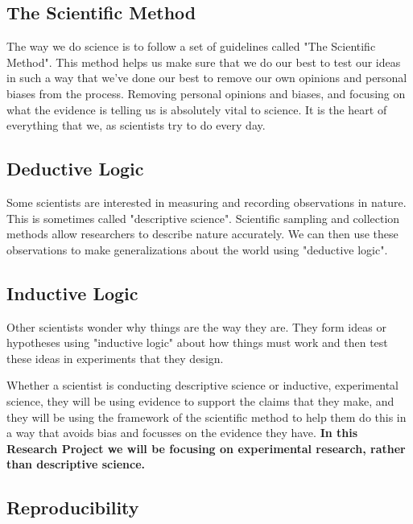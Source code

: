 \documentclass[
]{book}
\begin{document}
\hypertarget{the-scientific-method}{%
\subsection*{The Scientific Method}\label{the-scientific-method}}

The way we do science is to follow a set of guidelines called "The Scientific Method". This method helps us make sure that we do our best to test our ideas in such a way that we've done our best to remove our own opinions and personal biases from the process. Removing personal opinions and biases, and focusing on what the evidence is telling us is absolutely vital to science. It is the heart of everything that we, as scientists try to do every day.

\hypertarget{deductive-logic}{%
\subsection*{Deductive Logic}\label{deductive-logic}}

Some scientists are interested in measuring and recording observations in nature. This is sometimes called "descriptive science". Scientific sampling and collection methods allow researchers to describe nature accurately. We can then use these observations to make generalizations about the world using "deductive logic".

\hypertarget{inductive-logic}{%
\subsection*{Inductive Logic}\label{inductive-logic}}

Other scientists wonder why things are the way they are. They form ideas or hypotheses using "inductive logic" about how things must work and then test these ideas in experiments that they design.

Whether a scientist is conducting descriptive science or inductive, experimental science, they will be using evidence to support the claims that they make, and they will be using the framework of the scientific method to help them do this in a way that avoids bias and focusses on the evidence they have. \textbf{In this Research Project we will be focusing on experimental research, rather than descriptive science.}

\hypertarget{reproducibility}{%
\subsection*{Reproducibility}\label{reproducibility}}
\end{document}
